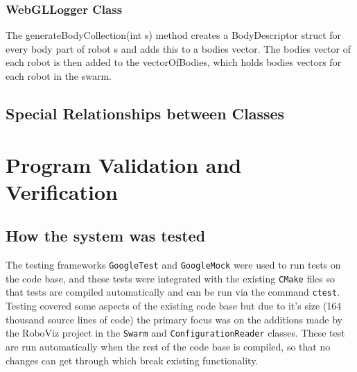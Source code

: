 \documentclass[11pt,a4paper]{article}
\begin{document}
\subsubsection{WebGLLogger Class}
The generateBodyCollection(int s) method creates a BodyDescriptor struct for
every body part of robot s and adds this to a bodies vector. The bodies vector
of each robot is then added to the vectorOfBodies, which holds bodies vectors
for each robot in the swarm.

\subsection{Special Relationships between Classes}



\section{Program Validation and Verification}
\label{s:progr-valid-verif}
%
%
%

\subsection{How the system was tested}
The testing frameworks \texttt{GoogleTest} and \texttt{GoogleMock} were used to
run tests on the code base, and these tests were integrated with the existing
\texttt{CMake} files so that tests are compiled automatically and can be run
via the command \texttt{ctest}. Testing covered some aspects of the existing
code base but due to it's size (164 thousand source lines of code) the primary
focus was on the additions made by the RoboViz project in the \texttt{Swarm}
and \texttt{ConfigurationReader} classes. These test are run automatically when
the rest of the code base is compiled, so that no changes can get through which
break existing functionality.
\end{document}
